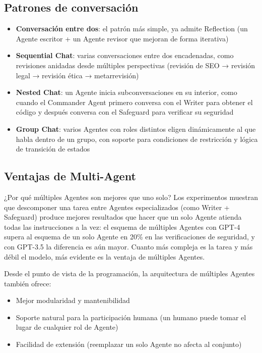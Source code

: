 \subsection{Patrones de conversación}

\begin{itemize}
    \item \textbf{Conversación entre dos}: el patrón más simple, ya admite Reflection (un Agente escritor + un Agente revisor que mejoran de forma iterativa)
    \item \textbf{Sequential Chat}: varias conversaciones entre dos encadenadas, como revisiones anidadas desde múltiples perspectivas (revisión de SEO → revisión legal → revisión ética → metarrevisión)
    \item \textbf{Nested Chat}: un Agente inicia subconversaciones en su interior, como cuando el Commander Agent primero conversa con el Writer para obtener el código y después conversa con el Safeguard para verificar su seguridad
    \item \textbf{Group Chat}: varios Agentes con roles distintos eligen dinámicamente al que habla dentro de un grupo, con soporte para condiciones de restricción y lógica de transición de estados
\end{itemize}

\subsection{Ventajas de Multi-Agent}

\begin{importantbox}{¿Por qué múltiples Agentes son mejores que uno solo?}
Los experimentos muestran que descomponer una tarea entre Agentes especializados (como Writer + Safeguard) produce mejores resultados que hacer que un solo Agente atienda todas las instrucciones a la vez: el esquema de múltiples Agentes con GPT-4 supera al esquema de un solo Agente en 20\% en las verificaciones de seguridad, y con GPT-3.5 la diferencia es aún mayor. Cuanto más compleja es la tarea y más débil el modelo, más evidente es la ventaja de múltiples Agentes.
\end{importantbox}

Desde el punto de vista de la programación, la arquitectura de múltiples Agentes también ofrece:
\begin{itemize}
    \item Mejor modularidad y mantenibilidad
    \item Soporte natural para la participación humana (un humano puede tomar el lugar de cualquier rol de Agente)
    \item Facilidad de extensión (reemplazar un solo Agente no afecta al conjunto)
\end{itemize}

